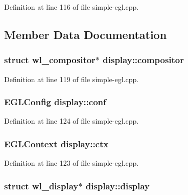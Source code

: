 Definition at line 116 of file simple-\/egl.\+cpp.



\subsection{Member Data Documentation}
\subsubsection[{\texorpdfstring{compositor}{compositor}}]{\setlength{\rightskip}{0pt plus 5cm}struct wl\+\_\+compositor$\ast$ display\+::compositor}\hypertarget{structdisplay_a41ba32dfde812165dda5b62885000c78}{}\label{structdisplay_a41ba32dfde812165dda5b62885000c78}


Definition at line 119 of file simple-\/egl.\+cpp.

\subsubsection[{\texorpdfstring{conf}{conf}}]{\setlength{\rightskip}{0pt plus 5cm}E\+G\+L\+Config display\+::conf}\hypertarget{structdisplay_a880aef9408b499f5b749541dc6e396c3}{}\label{structdisplay_a880aef9408b499f5b749541dc6e396c3}


Definition at line 124 of file simple-\/egl.\+cpp.

\subsubsection[{\texorpdfstring{ctx}{ctx}}]{\setlength{\rightskip}{0pt plus 5cm}E\+G\+L\+Context display\+::ctx}\hypertarget{structdisplay_a3420940a29a710e0e5ebd41ba462cc00}{}\label{structdisplay_a3420940a29a710e0e5ebd41ba462cc00}


Definition at line 123 of file simple-\/egl.\+cpp.

\subsubsection[{\texorpdfstring{display}{display}}]{\setlength{\rightskip}{0pt plus 5cm}struct wl\+\_\+display$\ast$ display\+::display}\hypertarget{structdisplay_aa8faf09631925e9221fd8a0c086ce75a}{}\label{structdisplay_aa8faf09631925e9221fd8a0c086ce75a}


